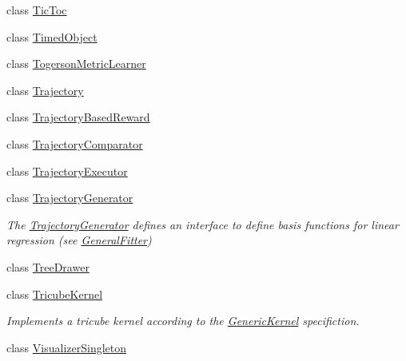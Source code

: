 \begin{DoxyCompactItemize}
class \hyperlink{classkukadu_1_1TicToc}{Tic\+Toc}
\item 
class \hyperlink{classkukadu_1_1TimedObject}{Timed\+Object}
\item 
class \hyperlink{classkukadu_1_1TogersonMetricLearner}{Togerson\+Metric\+Learner}
\item 
class \hyperlink{classkukadu_1_1Trajectory}{Trajectory}
\item 
class \hyperlink{classkukadu_1_1TrajectoryBasedReward}{Trajectory\+Based\+Reward}
\item 
class \hyperlink{classkukadu_1_1TrajectoryComparator}{Trajectory\+Comparator}
\item 
class \hyperlink{classkukadu_1_1TrajectoryExecutor}{Trajectory\+Executor}
\item 
class \hyperlink{classkukadu_1_1TrajectoryGenerator}{Trajectory\+Generator}
\begin{DoxyCompactList}\small\item\em The \hyperlink{classkukadu_1_1TrajectoryGenerator}{Trajectory\+Generator} defines an interface to define basis functions for linear regression (see \hyperlink{classkukadu_1_1GeneralFitter}{General\+Fitter}) \end{DoxyCompactList}\item 
class \hyperlink{classkukadu_1_1TreeDrawer}{Tree\+Drawer}
\item 
class \hyperlink{classkukadu_1_1TricubeKernel}{Tricube\+Kernel}
\begin{DoxyCompactList}\small\item\em Implements a tricube kernel according to the \hyperlink{classkukadu_1_1GenericKernel}{Generic\+Kernel} specifiction. \end{DoxyCompactList}\item 
class \hyperlink{classkukadu_1_1VisualizerSingleton}{Visualizer\+Singleton}
\end{DoxyCompactItemize}
